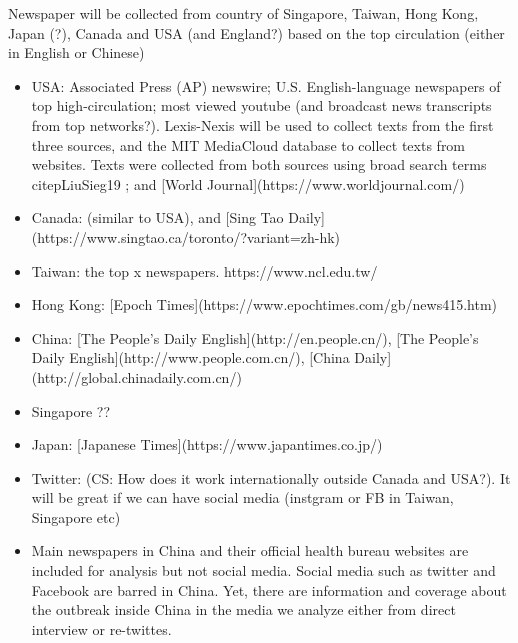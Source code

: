 Newspaper will be collected from country of Singapore, Taiwan, Hong Kong, Japan (?), Canada and USA (and England?) based on the top circulation (either in English or Chinese)
\begin{itemize}
\item{USA: Associated Press (AP) newswire; U.S. English-language newspapers of top high-circulation; most viewed youtube (and broadcast news transcripts from top networks?).  Lexis-Nexis will be used to collect texts from the first three sources, and the MIT MediaCloud database to collect texts from websites. Texts were collected from both sources using broad search terms citep{LiuSieg19} ; and [World Journal](https://www.worldjournal.com/)}
\item{Canada: (similar to USA), and [Sing Tao Daily](https://www.singtao.ca/toronto/?variant=zh-hk)}
\item{Taiwan: the top x newspapers. https://www.ncl.edu.tw/}
\item{Hong Kong: [Epoch Times](https://www.epochtimes.com/gb/news415.htm)}
\item{China:  [The People’s Daily English](http://en.people.cn/), [The People’s Daily English](http://www.people.com.cn/), [China Daily](http://global.chinadaily.com.cn/)}
\item{Singapore ??}
\item{Japan: [Japanese Times](https://www.japantimes.co.jp/)}
\item{Twitter: (CS:  How does it work internationally outside Canada and USA?).  It will be great if we can have social media (instgram or FB in Taiwan, Singapore etc)}
\item{Main newspapers in China and their official health bureau websites are included for analysis but not social media.   Social media such as twitter and Facebook are barred in China. Yet, there are information and coverage about the outbreak inside China in the media we analyze either from direct interview or re-twittes. }
\end{itemize}


